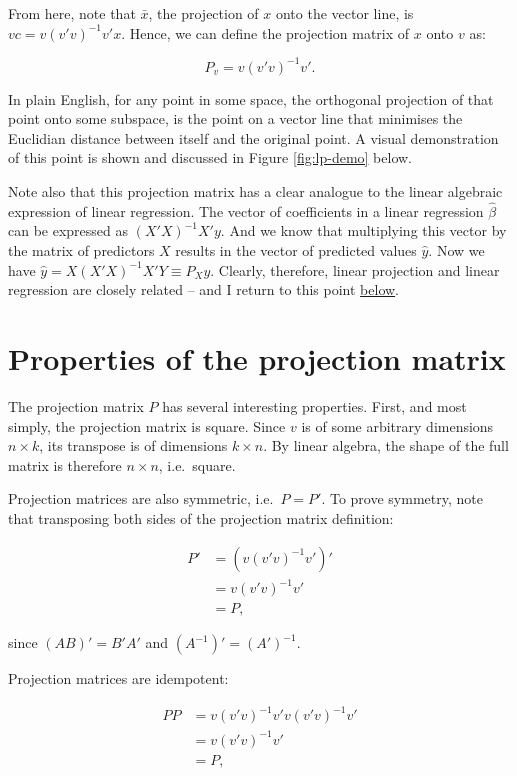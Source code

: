 \documentclass[
]{book}
\begin{document}
From here, note that \(\bar{x}\), the projection of \(x\) onto the vector line, is \(vc = v(v'v)^{-1}v'x.\) Hence, we can define the projection matrix of \(x\) onto \(v\) as:

\[ P_v = v(v'v)^{-1}v'.\]

In plain English, for any point in some space, the orthogonal projection of that point onto some subspace, is the point on a vector line that minimises the Euclidian distance between itself and the original point. A visual demonstration of this point is shown and discussed in Figure \ref{fig:lp-demo} below.

Note also that this projection matrix has a clear analogue to the linear algebraic expression of linear regression. The vector of coefficients in a linear regression \(\hat{\beta}\) can be expressed as \((X′X)^{-1}X′y\). And we know that multiplying this vector by the matrix of predictors \(X\) results in the vector of predicted values \(\hat{y}\). Now we have \(\hat{y} = X(X'X)^{-1}X'Y \equiv P_Xy\). Clearly, therefore, linear projection and linear regression are closely related -- and I return to this point \protect\hyperlink{lp_lr}{below}.

\hypertarget{proj_prop}{%
\section{Properties of the projection matrix}\label{proj_prop}}

The projection matrix \(P\) has several interesting properties. First, and most simply, the projection matrix is square. Since \(v\) is of some arbitrary dimensions \(n \times k\), its transpose is of dimensions \(k \times n\). By linear algebra, the shape of the full matrix is therefore \(n \times n\), i.e.~square.

Projection matrices are also symmetric, i.e.~\(P = P'\). To prove symmetry, note that transposing both sides of the projection matrix definition:

\begin{align}
P' &= (v(v'v)^{-1}v')' \\
&= v(v'v)^{-1}v'\\
&= P,
\end{align}

since \((AB)'=B'A'\) and \((A^{-1})' = (A')^{-1}.\)

Projection matrices are idempotent:

\begin{align}
PP &= v(v'v)^{-1}v'v(v'v)^{-1}v' \\
&= v(v'v)^{-1}v'\\
&= P,
\end{align}
\end{document}
